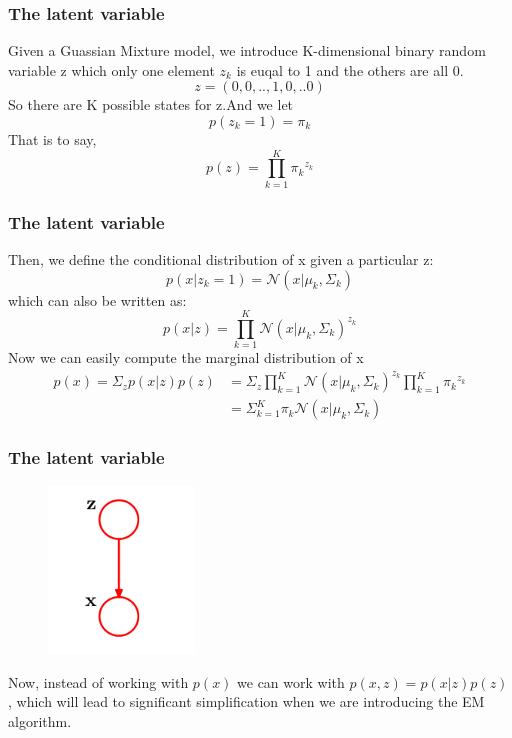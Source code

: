 \documentclass{beamer}
\begin{document}
\begin{frame}
\frametitle{The latent variable}
Given a Guassian Mixture model, we introduce K-dimensional binary random variable z which only one element $z_k$ is euqal to 1 and the others are all 0.\\
\begin{equation}
z=(0,0,..,1,0,..0)
\end{equation}
So there are K possible states for z.And we let
\begin{equation}
p(z_k=1) = \pi_k
\end{equation}
That is to say, 
\begin{equation}
p(z) = \prod^K_{k=1}{\pi_k}^{z_k}
\end{equation}
\end{frame}

\begin{frame}
\frametitle{The latent variable}
Then, we define the conditional distribution of x given a particular z:
\begin{equation}
p(x|z_k=1)=\mathcal{N}(x|\mu_k,\Sigma_k)
\end{equation}
which can also be written as:
\begin{equation}
p(x|z)=\prod^K_{k=1}{\mathcal{N}(x|\mu_k,\Sigma_k)}^{z_k}
\end{equation}
Now we can easily compute the marginal distribution of x
\begin{displaymath}
\begin{split}
p(x) = \Sigma_zp(x|z)p(z) &= \Sigma_z\prod^K_{k=1}{\mathcal{N}(x|\mu_k,\Sigma_k)}^{z_k}
\prod^K_{k=1}{\pi_k}^{z_k}\\
 &=\Sigma^K_{k=1}\pi_k\mathcal{N}(x|\mu_k,\Sigma_k)
\end{split}
\end{displaymath}
\end{frame}

\begin{frame}
\frametitle{The latent variable}
\begin{figure}
\includegraphics[width=110pt]{latent-variable.png}
\end{figure}
Now, instead of working with $p(x)$ we can work with $p(x,z) = p(x|z)p(z)$, which will lead to significant simplification when we are introducing the EM algorithm.
\end{frame}
\end{document}
